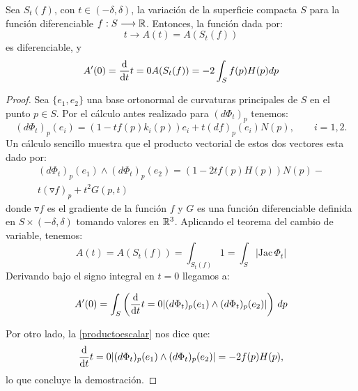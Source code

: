 \begin{proposition}
Sea $S_t(f)$, con $t \in (-\delta, \delta)$, la variación de la superficie compacta $S$ para la función diferenciable $f: S \longrightarrow \mathbb{R}$. Entonces, la función dada por:
%
\begin{equation*}
    t \longrightarrow A(t) = A(S_t(f))
\end{equation*}
%
es diferenciable, y
%
\begin{equation}\label{variacionarea}
    A'(0) = \diff{}{t}{t=0} A(S_t(f)) = -2 \int_S f(p)H(p) dp
\end{equation}
\end{proposition}
\begin{proof}
Sea $\{e_1, e_2\}$ una base ortonormal de curvaturas principales de $S$ en el punto $p \in S$. Por el cálculo antes realizado para $(d\Phi_t)_p$ tenemos:
%
\begin{equation*}
    (d\Phi_t)_p(e_i) = (1 - tf(p)k_i(p))e_i + t(df)_p(e_i)N(p), \qquad i=1,2.
\end{equation*}
%
Un cálculo sencillo muestra que el producto vectorial de estos dos vectores esta dado por:
%
\begin{multline}\label{productoescalar}
    (d\Phi_t)_p(e_1) \wedge (d\Phi_t)_p(e_2) = (1 - 2tf(p)H(p))N(p) - \\ t(\triangledown f)_p + t^2G(p,t)
\end{multline}
%
donde $\triangledown f$ es el gradiente de la función $f$ y $G$ es una función diferenciable definida en $S \times (-\delta, \delta)$ tomando valores en $\mathbb{R}^3$. Aplicando el teorema del cambio de variable, tenemos:
%
\begin{equation*}
    A(t) = A(S_t(f)) = \int_{S_t(f)} 1 = \int_S |\text{Jac} \, \Phi_t|
\end{equation*}
%
Derivando bajo el signo integral en $t=0$ llegamos a:

\begin{equation*}
    A'(0) = \int_S \left( \diff{}{t}{t=0} |(d\Phi_t)_p(e_1) \wedge (d\Phi_t)_p(e_2)| \right) \, dp 
\end{equation*}

Por otro lado, la \autoref{productoescalar} nos dice que:
%
\begin{equation*}
    \diff{}{t}{t=0} |(d\Phi_t)_p(e_1) \wedge (d\Phi_t)_p(e_2)| = -2f(p)H(p),
\end{equation*}
%
lo que concluye la demostración.
\end{proof}


